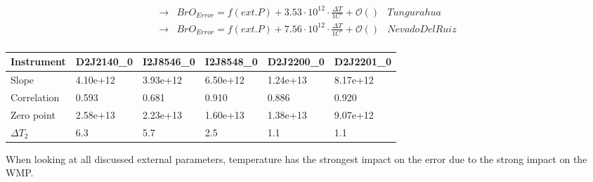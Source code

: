 \documentclass  [
  paper    = a4,
  BCOR     = 10mm,
  twoside,
  fontsize = 12pt,
  fleqn,
  toc      = bibnumbered,
  toc      = listofnumbered,
  numbers  = noendperiod,
  headings = normal,
  listof   = leveldown,
  version  = 3.03
]                                       {scrreprt}
\begin{document}
	\begin{align*}
		\rightarrow&  BrO_{Error} = f(ext. P)+ 3.53\cdot10^{12}\cdot\frac{\Delta T}{1C^{\circ}} + \mathcal{O}\left(\right) & Tungurahua\\
		\rightarrow&  BrO_{Error} = f(ext. P)+7.56\cdot10^{12}\cdot\frac{\Delta T}{1C^{\circ}} + \mathcal{O}\left(\right) & Nevado Del Ruiz\\
	\end{align*}


	\begin{table}[h]
		\begin{tabular}{|p{2cm}|p{2cm}|p{2cm}|p{2cm}|p{2cm}|p{2cm}|}
		Instrument	&D2J2140\_0&I2J8546\_0& I2J8548\_0&D2J2200\_0&D2J2201\_0\\
			\toprule
			Slope&4.10e+12 &3.93e+12 &6.50e+12 &1.24e+13&8.17e+12 \\
			\midrule
			Correlation
			& 
			0.593& 
			0.681& 
			0.910& 
			0.886& 
			0.920\\
			\midrule
			Zero point&2.58e+13&2.23e+13&1.60e+13& 1.38e+13& 9.07e+12\\
			\midrule
			$\Delta T_{2}$&6.3&5.7&2.5&1.1&1.1\\
			\bottomrule
		\end{tabular}
		\label{tab:tempe}
	\end{table}
	When looking at all discussed external parameters, temperature has  the strongest impact on the  error due to the strong impact on the WMP.
\end{document}
